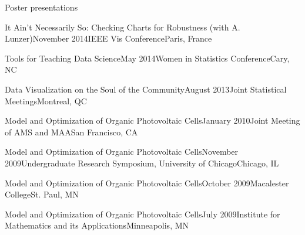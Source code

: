 \documentclass{resume} %
\begin{document}
\begin{rSection}{Poster presentations}

\begin{sSubsection}{It Ain't Necessarily So: Checking Charts for Robustness}{ (with A. Lunzer)}{November 2014}{IEEE Vis Conference}{Paris, France}
\end{sSubsection}

\begin{sSubsection}{Tools for Teaching Data Science}{}{May 2014}{Women in Statistics Conference}{Cary, NC}
\end{sSubsection}

\begin{sSubsection}{Data Visualization on the Soul of the Community}{}{August 2013}{Joint Statistical Meetings}{Montreal, QC}
\end{sSubsection}

\begin{sSubsection}{Model and Optimization of Organic Photovoltaic Cells}{}{January 2010}{Joint Meeting of AMS and MAA}{San Francisco, CA}
\end{sSubsection}

\begin{sSubsection}{Model and Optimization of Organic Photovoltaic Cells}{}{November 2009}{Undergraduate Research Symposium, University of Chicago}{Chicago, IL}
\end{sSubsection}

\begin{sSubsection}{Model and Optimization of Organic Photovoltaic Cells}{}{October 2009}{Macalester College}{St. Paul, MN}
\end{sSubsection}

\begin{sSubsection}{Model and Optimization of Organic Photovoltaic Cells}{}{July 2009}{Institute for Mathematics and its Applications}{Minneapolis, MN}
\end{sSubsection}
\end{rSection}
\end{document}
